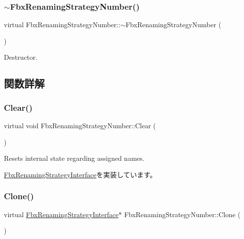 \subsubsection{\texorpdfstring{$\sim$\+Fbx\+Renaming\+Strategy\+Number()}{~FbxRenamingStrategyNumber()}}
{\footnotesize\ttfamily virtual Fbx\+Renaming\+Strategy\+Number\+::$\sim$\+Fbx\+Renaming\+Strategy\+Number (\begin{DoxyParamCaption}{ }\end{DoxyParamCaption})\hspace{0.3cm}{\ttfamily [virtual]}}



Destructor. 



\subsection{関数詳解}
\mbox{\label{class_fbx_renaming_strategy_number_aaf762d4d2ab243e6868b5d77a3ed8040}} 
\subsubsection{\texorpdfstring{Clear()}{Clear()}}
{\footnotesize\ttfamily virtual void Fbx\+Renaming\+Strategy\+Number\+::\+Clear (\begin{DoxyParamCaption}{ }\end{DoxyParamCaption})\hspace{0.3cm}{\ttfamily [virtual]}}



Resets internal state regarding assigned names. 



\hyperlink{class_fbx_renaming_strategy_interface_a2090b5ae43936b617ec5d75015923f69}{Fbx\+Renaming\+Strategy\+Interface}を実装しています。

\mbox{\label{class_fbx_renaming_strategy_number_a05a9960c25cbbabb79ab020930fed395}} 
\subsubsection{\texorpdfstring{Clone()}{Clone()}}
{\footnotesize\ttfamily virtual \hyperlink{class_fbx_renaming_strategy_interface}{Fbx\+Renaming\+Strategy\+Interface}$\ast$ Fbx\+Renaming\+Strategy\+Number\+::\+Clone (\begin{DoxyParamCaption}{ }\end{DoxyParamCaption})\hspace{0.3cm}{\ttfamily [virtual]}}

